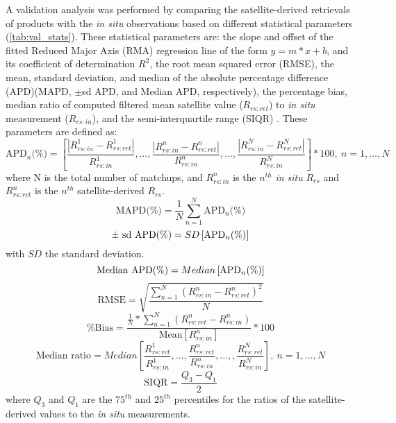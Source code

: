 \documentclass[onecolumn,3p,letterpaper,11pt]{elsarticle}
\begin{document}
A validation analysis was performed by comparing the satellite-derived retrievals of products with the {\it in situ} observations based on different statistical parameters (\autoref{tab:val_stats}). These statistical parameters are: the slope and offset of the fitted Reduced Major Axis (RMA) regression line of the form $y=m*x+b$, and its coefficient of determination $R^2$, the root mean squared error (RMSE), the mean, standard deviation, and median of the absolute percentage difference (APD)(MAPD, $\pm$sd APD, and Median APD, respectively), the percentage bias, median ratio of computed filtered mean satellite value ($R_{rs:ret}$) to {\it in situ} measurement ($R_{rs:in}$), and the semi-interquartile range (SIQR) \citep{Bailey2006}. These parameters are defined as:
\begin{equation}
  \text{APD$_n$(\%)}=\left[\frac{\displaystyle \left|R_{rs:in}^1-R_{rs:ret}^1 \right|}{R_{rs:in}^1},\dots,\frac{\displaystyle \left|R_{rs:in}^n-R_{rs:ret}^n \right|}{R_{rs:in}^n},\dots,\frac{\displaystyle \left|R_{rs:in}^N-R_{rs:ret}^N \right|}{R_{rs:in}^N}\right]*100,\ n=1,\dots,N
\end{equation}
\noindent where N is the total number of matchups, and $R_{rs:in}^n$ is the $n^{th}$ {\it in situ} $R_{rs}$ and $R_{rs:ret}^n$ is the $n^{th}$ satellite-derived $R_{rs}$.
\begin{equation}
  \text{MAPD(\%)} = \frac{1}{N} \sum_{n=1}^{N} \text{APD$_n$(\%)}
\end{equation}
\begin{equation}
  \text{$\pm$ \text{sd} APD(\%)} =  SD\left[\text{APD$_n$(\%)}\right]
\end{equation}
\noindent with $SD$ the standard deviation.
\begin{equation}
  \text{\text{Median} APD(\%)} =  Median\left[\text{APD$_n$(\%)}\right]
\end{equation}
\begin{equation}
   \text{RMSE} = \sqrt{\frac{\displaystyle \sum_{n=1}^{N} \left(R_{rs:in}^n-R_{rs:ret}^n\right)^2}{N}}
\end{equation} 
\begin{equation}
    \text{\% Bias} = \frac{\displaystyle \frac{1}{N}*\sum_{n=1}^N(R_{rs:ret}^n-R_{rs:in}^n)}{\text{Mean}[R_{rs:in}^n]}*100
\end{equation}
\begin{equation}
  \text{Median ratio} =  Median\left[\frac{R_{rs:ret}^1}{R_{rs:in}^1},\dots,\frac{R_{rs:ret}^n}{R_{rs:in}^n},\dots,,\frac{R_{rs:ret}^N}{R_{rs:in}^N}\right],\ n=1,\dots,N
\end{equation}
\begin{equation}
    \text{SIQR} = \frac{Q_3-Q_1}{2}
\end{equation}
\noindent where $Q_3$ and $Q_1$ are the $75^{th}$ and $25^{th}$ percentiles for the ratios of the satellite-derived values to the {\it in situ} measurements.  
\end{document}
